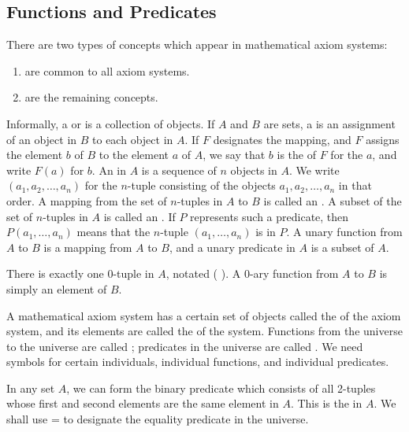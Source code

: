 \subsection{Functions and Predicates}

\begin{shaded*}
There are two types of concepts which appear in mathematical axiom systems:
\begin{enumerate}
    \item {} are common to all axiom systems.
    \item {} are the remaining concepts.
\end{enumerate}
\end{shaded*}

Informally, a  or  is a collection of objects.
If $A$ and $B$ are sets, a  is an assignment of an object in $B$ to each object in $A$.
If $F$ designates the mapping, and $F$ assigns the element $b$ of $B$ to the element $a$ of $A$, we say that $b$ is the  of $F$ for the  $a$, and write $F(a)$ for $b$.
An  in $A$ is a sequence of $n$ objects in $A$.
We write $(a_1, a_2, \ldots, a_n)$ for the $n$-tuple consisting of the objects $a_1, a_2, \ldots, a_n$ in that order.
A mapping from the set of $n$-tuples in $A$ to $B$ is called an .
A subset of the set of $n$-tuples in $A$ is called an .
If $P$ represents such a predicate, then $P(a_1, \ldots, a_n)$ means that the $n$-tuple $(a_1, \ldots, a_n)$ is in $P$.
A unary function from $A$ to $B$ is a mapping from $A$ to $B$, and a unary predicate in $A$ is a subset of $A$.

There is exactly one 0-tuple in $A$, notated ( ).
A 0-ary function from $A$ to $B$ is simply an element of $B$.

A mathematical axiom system has a certain set of objects called the  of the axiom system, and its elements are called the  of the system.
Functions from the universe to the universe are called ; predicates in the universe are called .
We need symbols for certain individuals, individual functions, and individual predicates.

In any set $A$, we can form the binary predicate which consists of all 2-tuples whose first and second elements are the same element in $A$.
This is the  in $A$.
We shall use = to designate the equality predicate in the universe.

